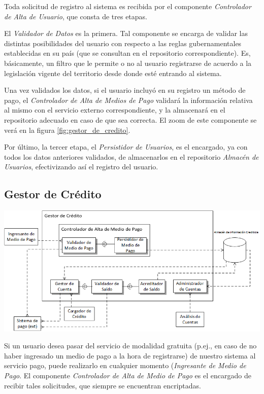 Toda solicitud de registro al sistema es recibida por el componente \emph{Controlador de Alta de Usuario}, que consta de tres etapas. 

El \emph{Validador de Datos} es la primera. Tal componente se encarga de validar las distintas posibilidades del usuario con respecto a las reglas gubernamentales establecidas en su país (que se consultan en el repositorio correspondiente). Es, básicamente, un filtro que le permite o no al usuario registrarse de acuerdo a la legislación vigente del territorio desde donde esté entrando al sistema.

Una vez validados los datos, si el usuario incluyó en su registro un método de pago, el \emph{Controlador de Alta de Medios de Pago} validará la información relativa al mismo con el servicio externo correspondiente, y la almacenará en el repositorio adecuado en caso de que sea correcta. El zoom de este componente se verá en la figura \ref{fig:gestor_de_credito}.

Por último, la tercer etapa, el \emph{Persistidor de Usuarios}, es el encargado, ya con todos los datos anteriores validados, de almacenarlos en el repositorio \emph{Almacén de Usuarios}, efectivizando así el registro del usuario.

\newpage
\subsection{Gestor de Crédito}
\begin{center}
\includegraphics[scale=0.80,angle=90]{diagramas/gestor_de_credito}
\label{fig:gestor_de_credito}
\end{center}

Si un usuario desea pasar del servicio de modalidad gratuita (p.ej., en caso de no haber ingresado un medio de pago a la hora de registrarse) de nuestro sistema al servicio pago, puede realizarlo en cualquier momento (\emph{Ingresante de Medio de Pago}. El componente \emph{Controlador de Alta de Medio de Pago} es el encargado de recibir tales solicitudes, que siempre se encuentran encriptadas.

